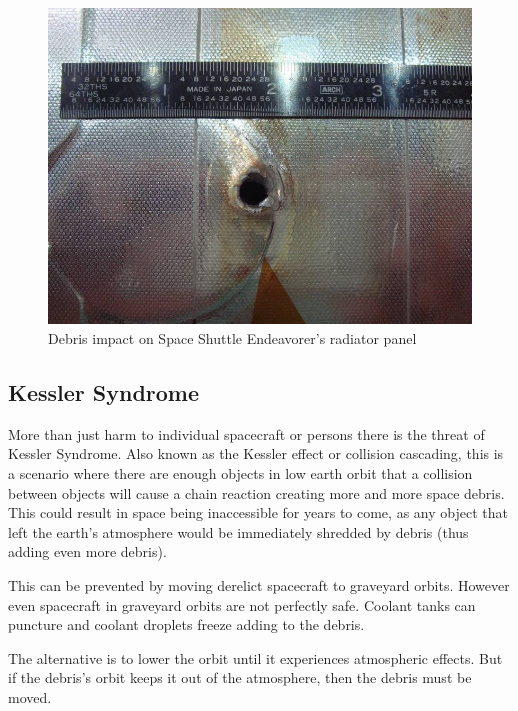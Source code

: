 \documentclass[12pt]{article}
\begin{document}
\begin{figure}
	\centering
	\includegraphics[width=0.7\linewidth]{STS-118_debris_entry}
	\caption{Debris impact on Space Shuttle Endeavorer's radiator panel\cite{endevHole}}
	\label{fig:sts-118debrisentry}
\end{figure}
	
	
	
	\subsection{Kessler Syndrome}
	More than just harm to individual spacecraft or persons there is the threat of Kessler Syndrome. Also known as the Kessler effect or collision cascading, this is a scenario where there are enough objects in low earth orbit that a collision between objects will cause a chain reaction creating more and more space debris. This could result in space being inaccessible for years to come, as any object that left the earth's atmosphere would be immediately shredded by debris (thus adding even more debris).\par 
	
	This can be prevented by moving derelict spacecraft to graveyard orbits. However even spacecraft in graveyard orbits are not perfectly safe. Coolant tanks can puncture and coolant droplets freeze adding to the debris. \par 
	
	The alternative is to lower the orbit until it experiences atmospheric effects. But if the debris's orbit keeps it out of the atmosphere, then the debris must be moved. 
\end{document}
